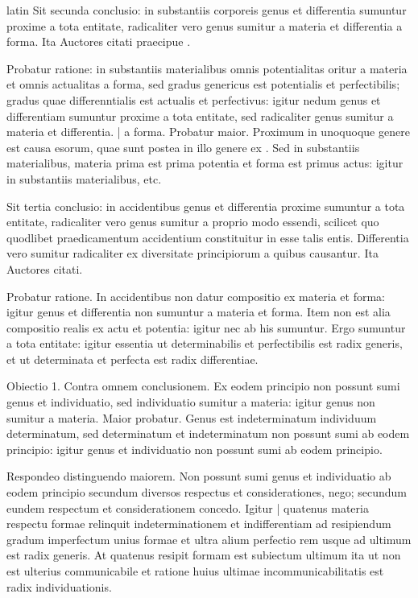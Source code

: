 \begin{otherlanguage*}{latin}
\pstart
 Sit secunda conclusio: in substantiis corporeis genus et differentia sumuntur proxime a tota entitate, radicaliter vero genus sumitur a materia et differentia a forma. Ita Auctores citati praecipue . 
\pend

\pstart
 Probatur ratione: in substantiis materialibus omnis potentialitas oritur a materia et omnis actualitas a forma, sed gradus genericus est potentialis et perfectibilis; gradus quae differenntialis est actualis et perfectivus: igitur nedum genus et differentiam sumuntur proxime a tota entitate, sed radicaliter genus sumitur a materia et differentia. \textnormal{|}    a forma. Probatur maior. Proximum in unoquoque genere est causa esorum, quae sunt postea in illo genere ex . Sed in substantiis materialibus, materia prima est prima potentia et forma est primus actus: igitur in substantiis materialibus, etc. 
\pend

\pstart
 Sit tertia conclusio: in accidentibus genus et differentia proxime sumuntur a tota entitate, radicaliter vero genus sumitur a proprio modo essendi, scilicet quo quodlibet praedicamentum accidentium constituitur in esse talis entis. Differentia vero sumitur radicaliter ex diversitate principiorum a quibus causantur. Ita Auctores citati. 
\pend

\pstart
 Probatur ratione. In accidentibus non datur compositio ex materia et forma: igitur genus et differentia non sumuntur a materia et forma. Item non est alia compositio realis ex actu et potentia: igitur nec ab his sumuntur. Ergo sumuntur a tota entitate: igitur essentia ut determinabilis et perfectibilis est radix generis, et ut determinata et perfecta est radix differentiae. 
\pend

\pstart
 Obiectio 1. Contra omnem conclusionem. Ex eodem principio non possunt sumi genus et individuatio, sed individuatio sumitur a materia: igitur genus non sumitur a materia. Maior probatur. Genus est indeterminatum individuum determinatum, sed determinatum et indeterminatum non possunt sumi ab eodem principio: igitur genus et individuatio non possunt sumi ab eodem principio. 
\pend

\pstart
 Respondeo distinguendo maiorem. Non possunt sumi genus et individuatio ab eodem principio secundum diversos respectus et considerationes, nego; secundum eundem respectum et considerationem concedo. Igitur \textnormal{|} quatenus materia respectu formae relinquit indeterminationem et indifferentiam ad resipiendum gradum imperfectum unius formae et ultra alium perfectio rem usque ad ultimum est radix generis. At quatenus resipit formam est subiectum ultimum ita ut non est ulterius communicabile et ratione huius ultimae incommunicabilitatis est radix individuationis. 
\pend


\end{otherlanguage*}
